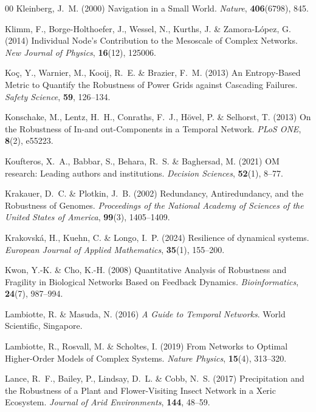 \documentclass{comnet-mod}
\begin{document}
\begin{thebibliography}{00}
Kleinberg, J.~M. (2000)  {Navigation in a Small World}. {\em {Nature}},
  \textbf{406}(6798), 845.

Klimm, F., {Borge-Holthoefer}, J., Wessel, N., Kurths, J. {\&}
  {Zamora-L{\'o}pez}, G. (2014)  {Individual Node's Contribution to the
  Mesoscale of Complex Networks}. {\em {New Journal of Physics}},
  \textbf{16}(12), 125006.

Ko{\c c}, Y., Warnier, M., Kooij, R.~E. {\&} Brazier, F.~M. (2013)  {An
  Entropy-Based Metric to Quantify the Robustness of Power Grids against
  Cascading Failures}. {\em {Safety Science}}, \textbf{59}, 126--134.

Konschake, M., Lentz, H.~H., Conraths, F.~J., H{\"o}vel, P. {\&} Selhorst, T.
  (2013)  {On the Robustness of In-and out-Components in a Temporal Network}.
  {\em {PLoS ONE}}, \textbf{8}(2), e55223.

Koufteros, X.~A., Babbar, S., Behara, R.~S. {\&} Baghersad, M. (2021)  {OM
  research: Leading authors and institutions}. {\em {Decision Sciences}},
  \textbf{52}(1), 8--77.

Krakauer, D.~C. {\&} Plotkin, J.~B. (2002)  {Redundancy, Antiredundancy, and
  the Robustness of Genomes}. {\em {Proceedings of the National Academy of
  Sciences of the United States of America}}, \textbf{99}(3), 1405--1409.

Krakovsk{\'a}, H., Kuehn, C. {\&} Longo, I.~P. (2024)  Resilience of dynamical
  systems. {\em {European Journal of Applied Mathematics}}, \textbf{35}(1),
  155--200.

Kwon, Y.-K. {\&} Cho, K.-H. (2008)  {Quantitative Analysis of Robustness and
  Fragility in Biological Networks Based on Feedback Dynamics}. {\em
  {Bioinformatics}}, \textbf{24}(7), 987--994.

Lambiotte, R. {\&} Masuda, N. (2016) {\em {A Guide to Temporal Networks}}.
{World Scientific}, {Singapore}.

Lambiotte, R., Rosvall, M. {\&} Scholtes, I. (2019)  {From Networks to Optimal
  Higher-Order Models of Complex Systems}. {\em {Nature Physics}},
  \textbf{15}(4), 313--320.

Lance, R.~F., Bailey, P., Lindsay, D.~L. {\&} Cobb, N.~S. (2017)
  {Precipitation and the Robustness of a Plant and Flower-Visiting Insect
  Network in a Xeric Ecosystem}. {\em {Journal of Arid Environments}},
  \textbf{144}, 48--59.


\end{thebibliography}
\end{document}
